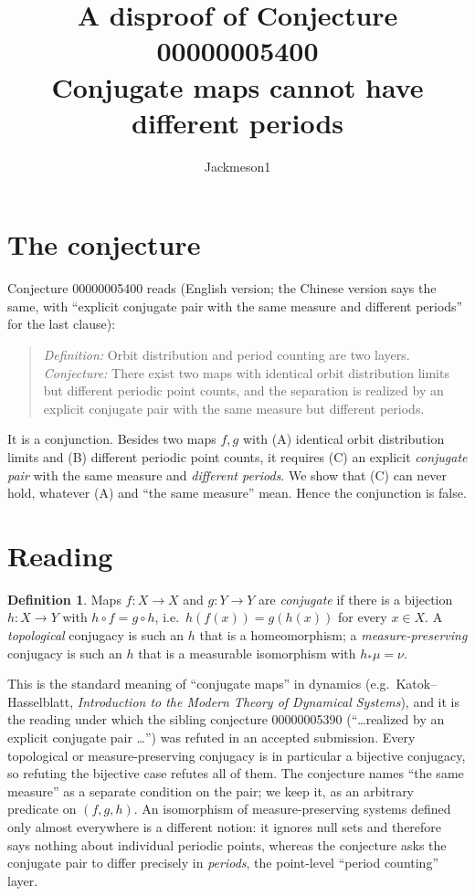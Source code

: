 \documentclass[11pt]{article}
\title{A disproof of Conjecture 00000005400\\[2pt]
\large Conjugate maps cannot have different periods}
\author{Jackmeson1}
\date{}
\theoremstyle{definition}
\newtheorem{definition}[theorem]{Definition}
\theoremstyle{remark}
\renewcommand{\_}{\oldus\allowbreak}
\begin{document}
\sloppy
\maketitle

\section{The conjecture}

Conjecture 00000005400 reads (English version; the Chinese version says the same, with
``explicit conjugate pair with the same measure and different periods'' for the last clause):

\begin{quote}
\emph{Definition:} Orbit distribution and period counting are two layers.
\emph{Conjecture:} There exist two maps with identical orbit distribution limits but different
periodic point counts, and the separation is realized by an explicit conjugate pair with the same
measure but different periods.
\end{quote}

It is a conjunction. Besides two maps $f,g$ with (A) identical orbit distribution limits and
(B) different periodic point counts, it requires (C) an explicit \emph{conjugate pair} with the same
measure and \emph{different periods}. We show that (C) can never hold, whatever (A) and ``the same
measure'' mean. Hence the conjunction is false.

\section{Reading}

\begin{definition}
Maps $f\colon X\to X$ and $g\colon Y\to Y$ are \emph{conjugate} if there is a bijection
$h\colon X\to Y$ with $h\circ f=g\circ h$, i.e.\ $h(f(x))=g(h(x))$ for every $x\in X$. A
\emph{topological} conjugacy is such an $h$ that is a homeomorphism; a \emph{measure-preserving}
conjugacy is such an $h$ that is a measurable isomorphism with $h_*\mu=\nu$.
\end{definition}

This is the standard meaning of ``conjugate maps'' in dynamics (e.g.\ Katok--Hasselblatt,
\emph{Introduction to the Modern Theory of Dynamical Systems}), and it is the reading under which the
sibling conjecture 00000005390 (``\ldots realized by an explicit conjugate pair \ldots'') was refuted in
an accepted submission. Every topological or measure-preserving conjugacy is in particular a bijective
conjugacy, so refuting the bijective case refutes all of them. The conjecture names ``the same measure''
as a separate condition on the pair; we keep it, as an arbitrary predicate on $(f,g,h)$. An isomorphism
of measure-preserving systems defined only almost everywhere is a different notion: it ignores null
sets and therefore says nothing about individual periodic points, whereas the conjecture asks the
conjugate pair to differ precisely in \emph{periods}, the point-level ``period counting'' layer.
\end{document}
